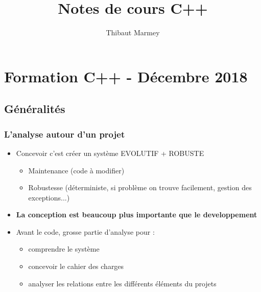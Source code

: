 \documentclass[12pt,a4paper]{article}
\author{Thibaut Marmey}
\title{Notes de cours C++}
\begin{document}
	\maketitle

\begin{normalsize}
\tableofcontents
\end{normalsize}

\section{Formation C++ - Décembre 2018}
\subsection{Généralités}
\subsubsection{L'analyse autour d'un projet}
\begin{itemize}
\item Concevoir c'est créer un système EVOLUTIF + ROBUSTE
\begin{itemize}
\item Maintenance (code à modifier)
\item Robustesse (déterministe, si problème on trouve facilement, gestion des exceptions...)
\end{itemize}
\item \textbf{La conception est beaucoup plus importante que le developpement}
\item Avant le code, grosse partie d'analyse pour : 
\begin{itemize}
\item comprendre le système
\item concevoir le cahier des charges
\item analyser les relations entre les différents éléments du projets
\end{itemize}
\end{itemize}
\end{document}
